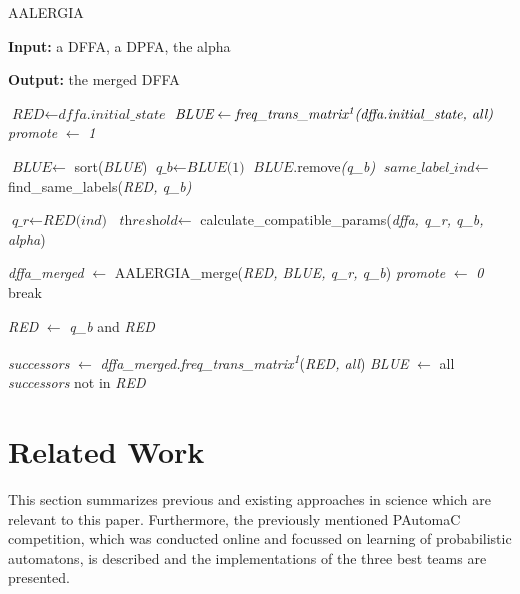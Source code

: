 \documentclass[
a4paper,
12pt
]{scrartcl}
\begin{document}
\begin{algorithm}[H]
\caption{AALERGIA}\label{alg:aalergia}
\begin{algorithmic}[1]
\item \textbf{Input:}  a DFFA, a DPFA, the alpha
\item \textbf{Output:} the merged DFFA

\State $\textit{RED} \gets \textit{dffa.initial\_state}$ \label{aalergia:redstart}
\State $\textit{BLUE} \gets \textit{freq\_trans\_matrix\textsuperscript{1}(dffa.initial\_state, all)}$ \label{aalergia:bluestart}
\State \textit{promote} $\gets$ \textit{1}


 \State $\textit{BLUE} \gets$ sort(\textit{BLUE})
 \State $\textit{q\_b} \gets \textit{BLUE(1)}$
 \State $\textit{BLUE}$.remove\textit{(q\_b)}
 \State $\textit{same\_label\_ind} \gets $find\_same\_labels(\textit{RED, q\_b)}

        \State $\textit{q\_r} \gets \textit{RED(ind)}$
        \State $\textit{threshold} \gets$ calculate\_compatible\_params(\textit{dffa, q\_r, q\_b, alpha})

         \label{aalergia:criterion}
          \State \textit{dffa\_merged} $\gets$ AALERGIA\_merge(\textit{RED, BLUE, q\_r, q\_b})
          \State \textit{promote} $\gets$ \textit{0}
          \State break
        \EndIf
\EndFor

          \State \textit{RED} $\gets$ \textit{q\_b} and \textit{RED} \label{aalergia:promote}
        \EndIf

    \State \textit{successors} $\gets$ \textit{dffa\_merged.freq\_trans\_matrix\textsuperscript{1}}(\textit{RED, all})
    \State \textit{BLUE} $\gets$ all \textit{successors} not in \textit{RED} \label{aalergia:excludeblue}
  \EndWhile
\end{algorithmic}
\end{algorithm}

\newpage
\section{Related Work}
This section summarizes previous and existing approaches in science which are relevant to this paper. Furthermore, the previously mentioned PAutomaC competition, which was conducted online and focussed on learning of probabilistic automatons, is described and the implementations of the three best teams are presented.
\end{document}
